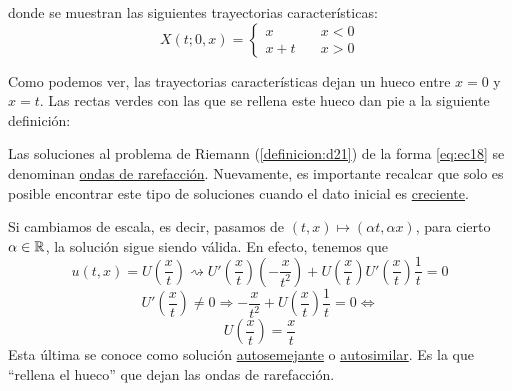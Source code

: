 \begin{ejemplo}
\begin{figure}[H]
\begin{center}
        \end{center}
    \end{figure}
    donde se muestran las siguientes trayectorias características: 
    \begin{equation*}
        X(t;0,x) = \begin{cases}
            x \quad& x < 0 \\
            x + t \quad& x > 0
        \end{cases}
    \end{equation*}
\end{ejemplo}

Como podemos ver, las trayectorias características dejan un hueco entre $x=0$ y $x=t$. Las rectas verdes con las que se rellena este hueco 
dan pie a la siguiente definición: 

\begin{definicion}
    Las soluciones al problema de Riemann (\ref{definicion:d21}) de la forma \eqref{eq:ec18} se denominan \underline{ondas de rarefacción}. 
    Nuevamente, es importante recalcar que solo es posible encontrar este tipo de soluciones cuando el dato inicial es \underline{creciente}.
\end{definicion}

\begin{observacion}
    Si cambiamos de escala, es decir, pasamos de $(t,x) \mapsto (\alpha t, \alpha x)$, para cierto $\alpha \in \mathbb{R}$, la solución sigue siendo válida.
    En efecto, tenemos que 
    $$u(t,x) = U \left( \dfrac{x}{t} \right) \rightsquigarrow 
    U'\left( \dfrac{x}{t} \right) \left( - \dfrac{x}{t^2} \right) + U \left( \dfrac{x}{t} \right) U' \left( \dfrac{x}{t} \right) \dfrac{1}{t} = 0$$
    $$U' \left( \dfrac{x}{t} \right) \neq 0 \Longrightarrow - \dfrac{x}{t^2} + U \left( \dfrac{x}{t} \right) \dfrac{1}{t} = 0 \iff$$
    \begin{equation}\label{eq:ec19}
        U \left( \dfrac{x}{t} \right) = \dfrac{x}{t}
    \end{equation}
    Esta última se conoce como solución \underline{autosemejante} o \underline{autosimilar}. Es la que ``rellena el hueco'' que dejan las ondas 
    de rarefacción.
\end{observacion}

